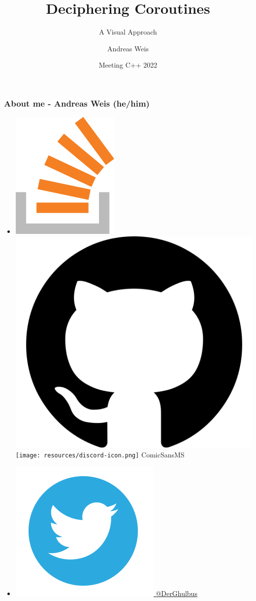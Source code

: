 \documentclass[aspectratio=169]{beamer}
\title{Deciphering Coroutines}
\subtitle{A Visual Approach}
\author{Andreas Weis}
\institute{Woven Planet}
\date{Meeting C++ 2022}
\begin{document}
\frame{\titlepage}

\iftrue %
\fi

\begin{frame}[fragile]
  \frametitle{About me - Andreas Weis (he/him)}

  \begin{itemize}
    \setlength\itemsep{1.5em}

    \item \href{https://stackoverflow.com/users/577603/comicsansms}{\includegraphics[height=.05\textheight]{resources/so-icon.png}} \href{https://github.com/ComicSansMS}{\includegraphics[height=.05\textheight]{resources/github-icon.png}} \texttt{[image: resources/discord-icon.png]} ComicSansMS

    \item \href{https://twitter.com/DerGhulbus/}{\includegraphics[height=.05\textheight]{resources/twitter-icon.png} @DerGhulbus}


\end{itemize}
\end{frame}
\end{document}

